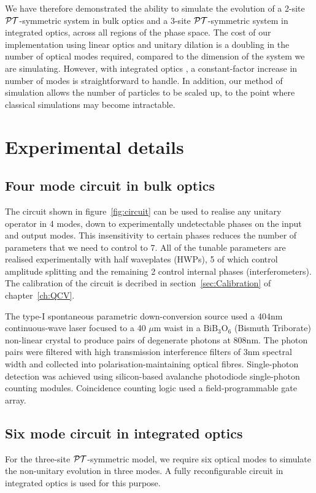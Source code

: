We have therefore demonstrated the ability to simulate the evolution of a 2-site
\(\mathcal{PT}{}\)-symmetric system in bulk optics and a 3-site \(\mathcal{PT}\)-symmetric system
in integrated optics, across all regions of the phase
space. The cost of our implementation using linear optics and unitary dilation
is a doubling in the number of optical modes required, compared to the dimension
of the system we are simulating. However, with integrated optics
, a constant-factor increase in number of modes is
straightforward to handle. In addition, our method of simulation allows the
number of particles to be scaled up, to the point where classical simulations
may become intractable.

\section{Experimental details}
\label{sec:SimulationExperiment}
\subsection{Four mode circuit in bulk optics}
The circuit shown in figure~\ref{fig:circuit} can be used to realise any
unitary operator in 4 modes, down to experimentally undetectable phases on the
input and output modes. This insensitivity to certain phases reduces the number
of parameters that we need to control to 7. All of the tunable parameters are
realised experimentally with half waveplates (HWPs), 5 of which control
amplitude splitting and the remaining 2 control internal phases
(interferometers). The calibration of the circuit is decribed in
section~\ref{sec:Calibration} of chapter~\ref{ch:QCV}.

The type-I spontaneous parametric down-conversion source used a 404nm
continuous-wave laser focused to a 40 \(\mu\)m waist in a \(\text{BiB}_3
\text{O}_6\) (Bismuth Triborate) non-linear crystal to produce pairs of
degenerate photons at 808nm. The photon pairs were filtered with high
transmission interference filters of 3nm spectral width and collected into
polarisation-maintaining optical fibres. Single-photon detection was achieved
using silicon-based avalanche photodiode single-photon counting modules.
Coincidence counting logic used a field-programmable gate array.

\subsection{Six mode circuit in integrated optics}
For the three-site \(\mathcal{PT}\)-symmetric model, we require six optical modes to
simulate the non-unitary evolution in three modes. A fully reconfigurable
circuit in integrated optics is used for this purpose.

